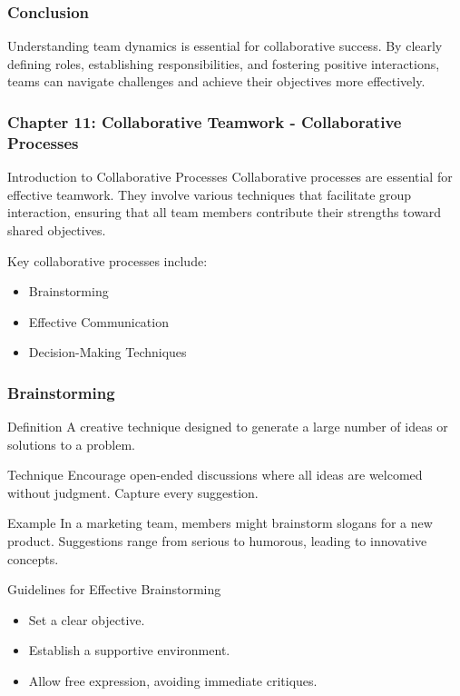 \documentclass[aspectratio=169]{beamer}
\begin{document}
\begin{frame}[fragile]
    \frametitle{Conclusion}
    Understanding team dynamics is essential for collaborative success. By clearly defining roles, establishing responsibilities, and fostering positive interactions, teams can navigate challenges and achieve their objectives more effectively.
\end{frame}

\begin{frame}[fragile]
    \frametitle{Chapter 11: Collaborative Teamwork - Collaborative Processes}
    \begin{block}{Introduction to Collaborative Processes}
        Collaborative processes are essential for effective teamwork. They involve various techniques that facilitate group interaction, ensuring that all team members contribute their strengths toward shared objectives.
    \end{block}
    
    Key collaborative processes include:
    \begin{itemize}
        \item Brainstorming
        \item Effective Communication
        \item Decision-Making Techniques
    \end{itemize}
\end{frame}

\begin{frame}[fragile]
    \frametitle{Brainstorming}
    \begin{block}{Definition}
        A creative technique designed to generate a large number of ideas or solutions to a problem.
    \end{block}
    
    \begin{block}{Technique}
        Encourage open-ended discussions where all ideas are welcomed without judgment. Capture every suggestion.
    \end{block}
    
    \begin{exampleblock}{Example}
        In a marketing team, members might brainstorm slogans for a new product. Suggestions range from serious to humorous, leading to innovative concepts.
    \end{exampleblock}
    
    \begin{block}{Guidelines for Effective Brainstorming}
        \begin{itemize}
            \item Set a clear objective.
            \item Establish a supportive environment.
            \item Allow free expression, avoiding immediate critiques.
        \end{itemize}
    \end{block}
\end{frame}
\end{document}
